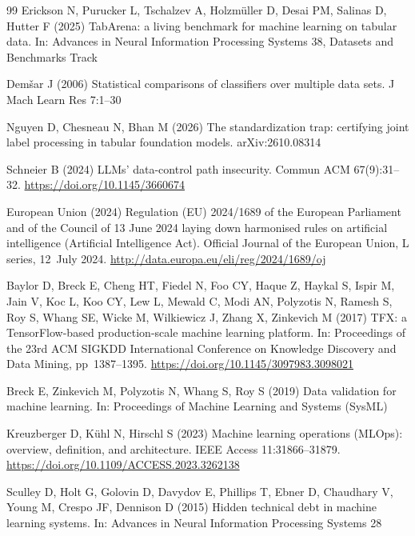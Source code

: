 \documentclass[pdflatex,sn-mathphys-num]{sn-jnl}
\begin{document}
\begin{thebibliography}{99}
Erickson N, Purucker L, Tschalzev A, Holzmüller D, Desai PM, Salinas D, Hutter F (2025) TabArena: a
living benchmark for machine learning on tabular data. In: Advances in Neural Information Processing
Systems 38, Datasets and Benchmarks Track

Demšar J (2006) Statistical comparisons of classifiers over multiple data sets.
J Mach Learn Res 7:1--30

Nguyen D, Chesneau N, Bhan M (2026) The standardization trap: certifying joint label processing in
tabular foundation models. arXiv:2610.08314

Schneier B (2024) LLMs' data-control path insecurity. Commun ACM 67(9):31--32.
\url{https://doi.org/10.1145/3660674}

European Union (2024) Regulation (EU) 2024/1689 of the European Parliament and of the Council of
13 June 2024 laying down harmonised rules on artificial intelligence (Artificial Intelligence Act).
Official Journal of the European Union, L series, 12~July 2024. \url{http://data.europa.eu/eli/reg/2024/1689/oj}

Baylor D, Breck E, Cheng HT, Fiedel N, Foo CY, Haque Z, Haykal S, Ispir M, Jain V, Koc L, Koo CY,
Lew L, Mewald C, Modi AN, Polyzotis N, Ramesh S, Roy S, Whang SE, Wicke M, Wilkiewicz J, Zhang X,
Zinkevich M (2017) TFX: a TensorFlow-based production-scale machine learning platform. In:
Proceedings of the 23rd ACM SIGKDD International Conference on Knowledge Discovery and Data
Mining, pp~1387--1395. \url{https://doi.org/10.1145/3097983.3098021}

Breck E, Zinkevich M, Polyzotis N, Whang S, Roy S (2019) Data validation for machine learning. In: Proceedings of Machine Learning and Systems (SysML)

Kreuzberger D, Kühl N, Hirschl S (2023) Machine learning operations (MLOps): overview,
definition, and architecture. IEEE Access 11:31866--31879. \url{https://doi.org/10.1109/ACCESS.2023.3262138}

Sculley D, Holt G, Golovin D, Davydov E, Phillips T, Ebner D, Chaudhary V, Young M, Crespo JF, Dennison D (2015) Hidden technical debt in machine learning systems. In: Advances in Neural Information Processing Systems 28


\end{thebibliography}
\end{document}
